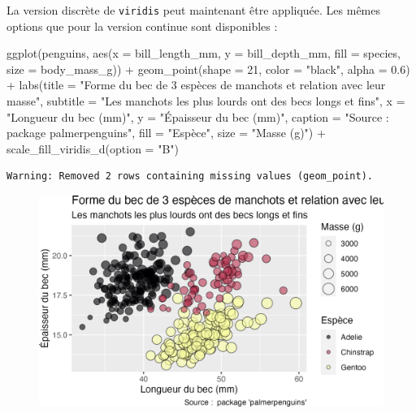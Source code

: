 \documentclass[
  letterpaper,
  DIV=11,
  numbers=noendperiod]{scrreprt}
\newenvironment{Shaded}{\begin{snugshade}}{\end{snugshade}}
\newcommand{\AttributeTok}[1]{\textcolor[rgb]{0.40,0.45,0.13}{#1}}
\newcommand{\DecValTok}[1]{\textcolor[rgb]{0.68,0.00,0.00}{#1}}
\newcommand{\FloatTok}[1]{\textcolor[rgb]{0.68,0.00,0.00}{#1}}
\newcommand{\FunctionTok}[1]{\textcolor[rgb]{0.28,0.35,0.67}{#1}}
\newcommand{\NormalTok}[1]{\textcolor[rgb]{0.00,0.23,0.31}{#1}}
\newcommand{\SpecialCharTok}[1]{\textcolor[rgb]{0.37,0.37,0.37}{#1}}
\newcommand{\StringTok}[1]{\textcolor[rgb]{0.13,0.47,0.30}{#1}}
\begin{document}
La version discrète de \texttt{viridis} peut maintenant être appliquée.
Les mêmes options que pour la version continue sont disponibles :

\begin{Shaded}
\begin{Highlighting}[]
\FunctionTok{ggplot}\NormalTok{(penguins, }\FunctionTok{aes}\NormalTok{(}\AttributeTok{x =}\NormalTok{ bill\_length\_mm, }\AttributeTok{y =}\NormalTok{ bill\_depth\_mm,}
                     \AttributeTok{fill =}\NormalTok{ species, }\AttributeTok{size =}\NormalTok{ body\_mass\_g)) }\SpecialCharTok{+}
  \FunctionTok{geom\_point}\NormalTok{(}\AttributeTok{shape =} \DecValTok{21}\NormalTok{, }\AttributeTok{color =} \StringTok{"black"}\NormalTok{, }\AttributeTok{alpha =} \FloatTok{0.6}\NormalTok{) }\SpecialCharTok{+}
  \FunctionTok{labs}\NormalTok{(}\AttributeTok{title =} \StringTok{"Forme du bec de 3 espèces de manchots et relation avec leur masse"}\NormalTok{,}
       \AttributeTok{subtitle =} \StringTok{"Les manchots les plus lourds ont des becs longs et fins"}\NormalTok{,}
       \AttributeTok{x =} \StringTok{"Longueur du bec (mm)"}\NormalTok{,}
       \AttributeTok{y =} \StringTok{"Épaisseur du bec (mm)"}\NormalTok{,}
       \AttributeTok{caption =} \StringTok{"Source :  package \textquotesingle{}palmerpenguins\textquotesingle{}"}\NormalTok{,}
       \AttributeTok{fill =} \StringTok{"Espèce"}\NormalTok{,}
       \AttributeTok{size =} \StringTok{"Masse (g)"}\NormalTok{) }\SpecialCharTok{+}
  \FunctionTok{scale\_fill\_viridis\_d}\NormalTok{(}\AttributeTok{option =} \StringTok{"B"}\NormalTok{)}
\end{Highlighting}
\end{Shaded}

\begin{verbatim}
Warning: Removed 2 rows containing missing values (geom_point).
\end{verbatim}

\begin{figure}[H]

{\centering \includegraphics{./03-visualization_files/figure-pdf/unnamed-chunk-99-1.png}

}

\end{figure}
\end{document}
